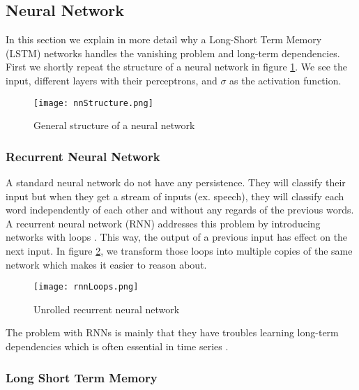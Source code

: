 \subsection{Neural Network}
\label{sec:nn}

In this section we explain in more detail why a Long-Short Term Memory (LSTM) \cite{lstmOrginin:article} networks handles the vanishing problem and long-term dependencies. \\

First we shortly repeat the structure of a neural network in figure \ref{fig:nnStructure}. We see the input, different layers with their perceptrons, and $\sigma$ as the activation function. 

\begin{figure}[H]
	\centering
	\texttt{[image: nnStructure.png]}
	\caption{General structure of a neural network \cite{IMECJaak}}
	\label{fig:nnStructure}
\end{figure} 

\subsubsection{Recurrent Neural Network}
\label{sec:rnn}

A standard neural network do not have any persistence. They will classify their input but when they get a stream of inputs (ex. speech), they will classify each word independently of each other and without any regards of the previous words. A recurrent neural network (RNN) addresses this problem by introducing networks with loops \cite{rnnOrigin:article}. This way, the output of a previous input has effect on the next input. In figure \ref{fig:rnnLoops}, we transform those loops into multiple copies of the same network which makes it easier to reason about.

\begin{figure}[H]
	\centering
	\texttt{[image: rnnLoops.png]}
	\caption{Unrolled recurrent neural network \cite{IMECJaak}}
	\label{fig:rnnLoops}
\end{figure} 

The problem with RNNs is mainly that they have troubles learning long-term dependencies which is often essential in time series \cite{longDepRNN:article}.


\subsubsection{Long Short Term Memory}
\label{sec:lstm}

